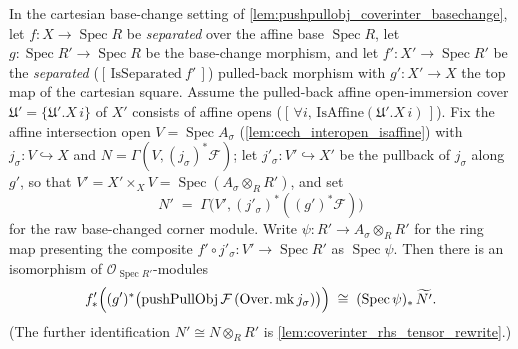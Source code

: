 \begin{lemma}\leanok
  \label{lem:coverinter_rhs_iso_tilde}
  In the cartesian base-change setting of \cref{lem:pushpullobj_coverinter_basechange}, let
  \(f : X \to \operatorname{Spec} R\) be \emph{separated} over the affine base
  \(\operatorname{Spec} R\), let \(g : \operatorname{Spec} R' \to \operatorname{Spec} R\) be the
  base-change morphism, and let \(f' : X' \to \operatorname{Spec} R'\) be the \emph{separated}
  (\([\,\mathrm{IsSeparated}\ f'\,]\)) pulled-back morphism with \(g' : X' \to X\) the top map of
  the cartesian square. Assume the pulled-back affine open-immersion cover
  \(\mathfrak{U}' = \{\mathfrak{U}'.X\, i\}\) of \(X'\) consists of affine opens
  (\([\,\forall i,\,\mathrm{IsAffine}(\mathfrak{U}'.X\,i)\,]\)). Fix the affine intersection
  open \(V = \operatorname{Spec} A_\sigma\) (\cref{lem:cech_interopen_isaffine}) with
  \(j_\sigma : V \hookrightarrow X\) and \(N = \Gamma(V, (j_\sigma)^*\mathcal{F})\); let
  \(j'_\sigma : V' \hookrightarrow X'\) be the pullback of \(j_\sigma\) along \(g'\), so that
  \(V' = X' \times_X V = \operatorname{Spec}(A_\sigma \otimes_R R')\), and set
  \[
    N' \;=\; \Gamma\bigl(V', (j'_\sigma)^*((g')^*\mathcal{F})\bigr)
  \]
  for the raw base-changed corner module. Write \(\psi : R' \to A_\sigma \otimes_R R'\) for the
  ring map presenting the composite \(f' \circ j'_\sigma : V' \to \operatorname{Spec} R'\) as
  \(\operatorname{Spec}\psi\). Then there is an isomorphism of
  \(\mathcal{O}_{\operatorname{Spec} R'}\)-modules
  \[
    f'_*\Bigl((g')^*\bigl(\operatorname{pushPullObj}\mathcal{F}\,
      (\operatorname{Over.mk} j_\sigma)\bigr)\Bigr)
      \;\cong\; (\operatorname{Spec}\psi)_*\,\widetilde{N'}.
  \]
  (The further identification \(N' \cong N \otimes_R R'\) is
  \cref{lem:coverinter_rhs_tensor_rewrite}.)
\end{lemma}
